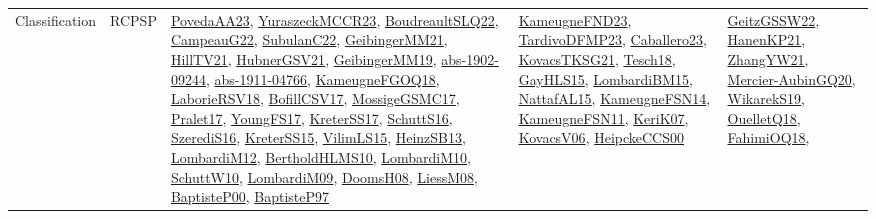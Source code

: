 {\begin{longtable}{llp{6cm}p{6cm}p{6cm}}
Classification & RCPSP & \href{papers/PovedaAA23.pdf}{PovedaAA23}\cite{PovedaAA23}, \href{articles/YuraszeckMCCR23.pdf}{YuraszeckMCCR23}\cite{YuraszeckMCCR23}, \href{papers/BoudreaultSLQ22.pdf}{BoudreaultSLQ22}\cite{BoudreaultSLQ22}, \href{articles/CampeauG22.pdf}{CampeauG22}\cite{CampeauG22}, \href{articles/SubulanC22.pdf}{SubulanC22}\cite{SubulanC22}, \href{papers/GeibingerMM21.pdf}{GeibingerMM21}\cite{GeibingerMM21}, \href{papers/HillTV21.pdf}{HillTV21}\cite{HillTV21}, \href{articles/HubnerGSV21.pdf}{HubnerGSV21}\cite{HubnerGSV21}, \href{papers/GeibingerMM19.pdf}{GeibingerMM19}\cite{GeibingerMM19}, \href{articles/abs-1902-09244.pdf}{abs-1902-09244}\cite{abs-1902-09244}, \href{articles/abs-1911-04766.pdf}{abs-1911-04766}\cite{abs-1911-04766}, \href{papers/KameugneFGOQ18.pdf}{KameugneFGOQ18}\cite{KameugneFGOQ18}, \href{articles/LaborieRSV18.pdf}{LaborieRSV18}\cite{LaborieRSV18}, \href{papers/BofillCSV17.pdf}{BofillCSV17}\cite{BofillCSV17}, \href{papers/MossigeGSMC17.pdf}{MossigeGSMC17}\cite{MossigeGSMC17}, \href{papers/Pralet17.pdf}{Pralet17}\cite{Pralet17}, \href{papers/YoungFS17.pdf}{YoungFS17}\cite{YoungFS17}, \href{articles/KreterSS17.pdf}{KreterSS17}\cite{KreterSS17}, \href{papers/SchuttS16.pdf}{SchuttS16}\cite{SchuttS16}, \href{papers/SzerediS16.pdf}{SzerediS16}\cite{SzerediS16}, \href{papers/KreterSS15.pdf}{KreterSS15}\cite{KreterSS15}, \href{papers/VilimLS15.pdf}{VilimLS15}\cite{VilimLS15}, \href{articles/HeinzSB13.pdf}{HeinzSB13}\cite{HeinzSB13}, \href{articles/LombardiM12.pdf}{LombardiM12}\cite{LombardiM12}, \href{papers/BertholdHLMS10.pdf}{BertholdHLMS10}\cite{BertholdHLMS10}, \href{papers/LombardiM10.pdf}{LombardiM10}\cite{LombardiM10}, \href{papers/SchuttW10.pdf}{SchuttW10}\cite{SchuttW10}, \href{papers/LombardiM09.pdf}{LombardiM09}\cite{LombardiM09}, \href{papers/DoomsH08.pdf}{DoomsH08}\cite{DoomsH08}, \href{articles/LiessM08.pdf}{LiessM08}\cite{LiessM08}, \href{articles/BaptisteP00.pdf}{BaptisteP00}\cite{BaptisteP00}, \href{papers/BaptisteP97.pdf}{BaptisteP97}\cite{BaptisteP97} & \href{papers/KameugneFND23.pdf}{KameugneFND23}\cite{KameugneFND23}, \href{papers/TardivoDFMP23.pdf}{TardivoDFMP23}\cite{TardivoDFMP23}, \href{articles/Caballero23.pdf}{Caballero23}\cite{Caballero23}, \href{papers/KovacsTKSG21.pdf}{KovacsTKSG21}\cite{KovacsTKSG21}, \href{papers/Tesch18.pdf}{Tesch18}\cite{Tesch18}, \href{papers/GayHLS15.pdf}{GayHLS15}\cite{GayHLS15}, \href{papers/LombardiBM15.pdf}{LombardiBM15}\cite{LombardiBM15}, \href{articles/NattafAL15.pdf}{NattafAL15}\cite{NattafAL15}, \href{articles/KameugneFSN14.pdf}{KameugneFSN14}\cite{KameugneFSN14}, \href{papers/KameugneFSN11.pdf}{KameugneFSN11}\cite{KameugneFSN11}, \href{papers/KeriK07.pdf}{KeriK07}\cite{KeriK07}, \href{papers/KovacsV06.pdf}{KovacsV06}\cite{KovacsV06}, \href{articles/HeipckeCCS00.pdf}{HeipckeCCS00}\cite{HeipckeCCS00} & \href{papers/GeitzGSSW22.pdf}{GeitzGSSW22}\cite{GeitzGSSW22}, \href{papers/HanenKP21.pdf}{HanenKP21}\cite{HanenKP21}, \href{articles/ZhangYW21.pdf}{ZhangYW21}\cite{ZhangYW21}, \href{papers/Mercier-AubinGQ20.pdf}{Mercier-AubinGQ20}\cite{Mercier-AubinGQ20}, \href{articles/WikarekS19.pdf}{WikarekS19}\cite{WikarekS19}, \href{papers/OuelletQ18.pdf}{OuelletQ18}\cite{OuelletQ18}, \href{articles/FahimiOQ18.pdf}{FahimiOQ18}\cite{FahimiOQ18}, 
\end{longtable}}
